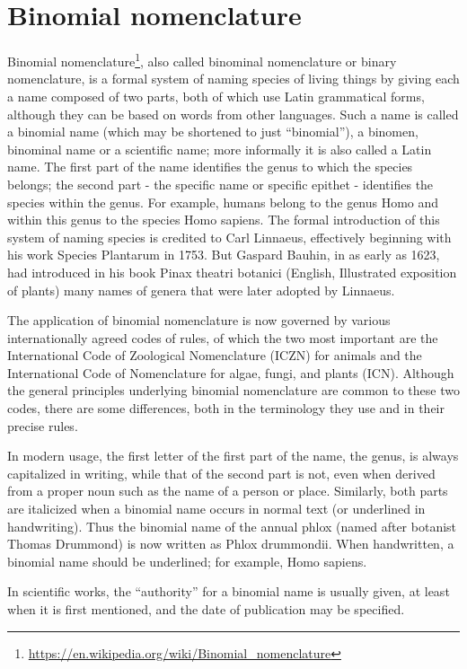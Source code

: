 \documentclass[]{book}
\let\rmarkdownfootnote\footnote%
\def\footnote{\protect\rmarkdownfootnote}
\renewcommand{\href}[2]{#2\footnote{\url{#1}}}
\theoremstyle{definition}
\theoremstyle{definition}
\theoremstyle{definition}
\theoremstyle{remark}
\begin{document}
\section{Binomial nomenclature}\label{binomial-nomenclature}

\href{https://en.wikipedia.org/wiki/Binomial_nomenclature}{Binomial
nomenclature}, also called binominal nomenclature or binary
nomenclature, is a formal system of naming species of living things by
giving each a name composed of two parts, both of which use Latin
grammatical forms, although they can be based on words from other
languages. Such a name is called a binomial name (which may be shortened
to just ``binomial''), a binomen, binominal name or a scientific name;
more informally it is also called a Latin name. The first part of the
name identifies the genus to which the species belongs; the second part
- the specific name or specific epithet - identifies the species within
the genus. For example, humans belong to the genus Homo and within this
genus to the species Homo sapiens. The formal introduction of this
system of naming species is credited to Carl Linnaeus, effectively
beginning with his work Species Plantarum in 1753. But Gaspard Bauhin,
in as early as 1623, had introduced in his book Pinax theatri botanici
(English, Illustrated exposition of plants) many names of genera that
were later adopted by Linnaeus.

The application of binomial nomenclature is now governed by various
internationally agreed codes of rules, of which the two most important
are the International Code of Zoological Nomenclature (ICZN) for animals
and the International Code of Nomenclature for algae, fungi, and plants
(ICN). Although the general principles underlying binomial nomenclature
are common to these two codes, there are some differences, both in the
terminology they use and in their precise rules.

In modern usage, the first letter of the first part of the name, the
genus, is always capitalized in writing, while that of the second part
is not, even when derived from a proper noun such as the name of a
person or place. Similarly, both parts are italicized when a binomial
name occurs in normal text (or underlined in handwriting). Thus the
binomial name of the annual phlox (named after botanist Thomas Drummond)
is now written as Phlox drummondii. When handwritten, a binomial name
should be underlined; for example, Homo sapiens.

In scientific works, the ``authority'' for a binomial name is usually
given, at least when it is first mentioned, and the date of publication
may be specified.
\end{document}
